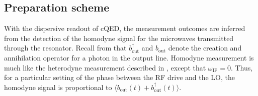 \subsection{Preparation scheme}\label{sec:prep}
With the dispersive readout of cQED, the measurement outcomes are inferred from the detection of the homodyne signal for the microwaves transmitted through the resonator. Recall from  that $b_\text{out}^\dag$ and $b_\text{out}$ denote the creation and annihilation operator for a photon in the output line. Homodyne measurement is much like the heterodyne measurement described in , except that $\omega_\text{IF}=0$. Thus, for a particular setting of the phase between the RF drive and the LO, the homodyne signal is proportional to $\langle b_\text{out}(t) + b_\text{out}^\dag(t)\rangle$.

